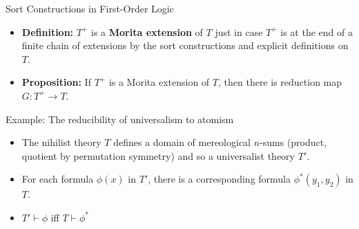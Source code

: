 \documentclass[fleqn]{beamer}
\begin{document}
\begin{frame}{Sort Constructions in First-Order Logic}
\centering
{}
\end{frame}


\begin{frame}

  \begin{itemize}
  \item \textbf{Definition:} $T^+$ is a \textbf{Morita extension} of
    $T$ just in case $T^+$ is at the end of a finite chain of
    extensions by the sort constructions and explicit definitions on
    $T$.
  \item \textbf{Proposition:} If $T^+$ is a Morita extension of $T$,
    then there is reduction map $G:T^+\to T$.
  \end{itemize}

\end{frame}  


\begin{frame}{Example: The reducibility of universalism to atomism}

  \begin{itemize}
  \item The nihilist theory $T$ defines a domain of mereological
    $n$-sums (product, quotient by permutation symmetry) and so a
    universalist theory $T'$.
  \item For each formula $\phi (x)$ in $T'$, there is a corresponding
    formula $\phi ^*(y_1,y_2)$ in $T$.
  \item $T'\vdash\phi$ iff $T\vdash \phi ^*$
  \end{itemize}


\end{frame}
\end{document}
